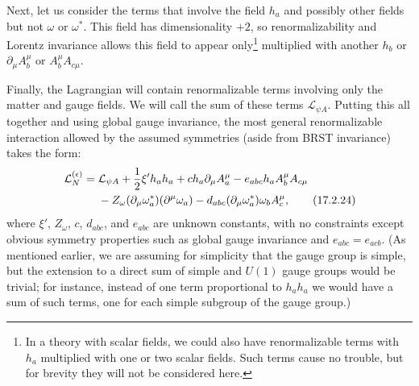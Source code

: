 Next, let us consider the terms that involve the field $h_a$ and possibly other fields but not $\omega$ or $\omega^*$. This field has dimensionality $+2$, so renormalizability and Lorentz invariance allows this field to appear only\footnote{In a theory with scalar fields, we could also have renormalizable terms with $h_a$ multiplied with one or two scalar fields. Such terms cause no trouble, but for brevity they will not be considered here.} multiplied with another $h_b$ or $\partial_\mu A_b^\mu$ or $A_b^\mu A_{c\mu}$.

Finally, the Lagrangian will contain renormalizable terms involving only the matter and gauge fields. We will call the sum of these terms $\mathcal L_{\psi A}$. Putting this all together and using global gauge invariance, the most general renormalizable interaction allowed by the assumed symmetries (aside from BRST invariance) takes the form:
\begin{align}
\mathcal L_N^{(\epsilon)}={}&\mathcal L_{\psi A}
+\frac12\xi' h_a h_a
+c h_a\partial_\mu A_a^\mu
-e_{abc}h_a A_b^\mu A_{c\mu}
\notag\\
&-Z_\omega(\partial_\mu\omega_a^*)(\partial^\mu\omega_a)
-d_{abc}(\partial_\mu\omega_a^*)\omega_b A_c^\mu,
\tag{17.2.24}\label{eq:17.2.24}
\end{align}
where $\xi'$, $Z_\omega$, $c$, $d_{abc}$, and $e_{abc}$ are unknown constants, with no constraints except obvious symmetry properties such as global gauge invariance and $e_{abc}=e_{acb}$. (As mentioned earlier, we are assuming for simplicity that the gauge group is simple, but the extension to a direct sum of simple and $U(1)$ gauge groups would be trivial; for instance, instead of one term proportional to $h_a h_a$ we would have a sum of such terms, one for each simple subgroup of the gauge group.)

